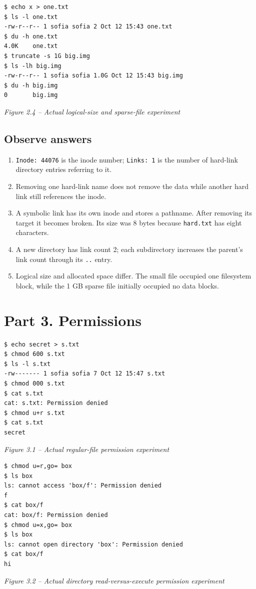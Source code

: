 \documentclass[12pt,a4paper]{article}
\newcommand{\figcap}[1]{\begin{center}\small\textit{#1}\end{center}\vspace{0.4em}}
\begin{document}
\begin{lstlisting}
$ echo x > one.txt
$ ls -l one.txt
-rw-r--r-- 1 sofia sofia 2 Oct 12 15:43 one.txt
$ du -h one.txt
4.0K    one.txt
$ truncate -s 1G big.img
$ ls -lh big.img
-rw-r--r-- 1 sofia sofia 1.0G Oct 12 15:43 big.img
$ du -h big.img
0       big.img
\end{lstlisting}
\figcap{Figure 2.4 -- Actual logical-size and sparse-file experiment}

\subsection{Observe answers}
\begin{enumerate}[label=\arabic*.]
\item \texttt{Inode: 44076} is the inode number; \texttt{Links: 1} is the number of hard-link directory entries referring to it.
\item Removing one hard-link name does not remove the data while another hard link still references the inode.
\item A symbolic link has its own inode and stores a pathname. After removing its target it becomes broken. Its size was 8 bytes because \texttt{hard.txt} has eight characters.
\item A new directory has link count 2; each subdirectory increases the parent's link count through its \texttt{..} entry.
\item Logical size and allocated space differ. The small file occupied one filesystem block, while the 1 GB sparse file initially occupied no data blocks.
\end{enumerate}

\section{Part 3. Permissions}
\begin{lstlisting}
$ echo secret > s.txt
$ chmod 600 s.txt
$ ls -l s.txt
-rw------- 1 sofia sofia 7 Oct 12 15:47 s.txt
$ chmod 000 s.txt
$ cat s.txt
cat: s.txt: Permission denied
$ chmod u+r s.txt
$ cat s.txt
secret
\end{lstlisting}
\figcap{Figure 3.1 -- Actual regular-file permission experiment}

\begin{lstlisting}
$ chmod u=r,go= box
$ ls box
ls: cannot access 'box/f': Permission denied
f
$ cat box/f
cat: box/f: Permission denied
$ chmod u=x,go= box
$ ls box
ls: cannot open directory 'box': Permission denied
$ cat box/f
hi
\end{lstlisting}
\figcap{Figure 3.2 -- Actual directory read-versus-execute permission experiment}
\end{document}
